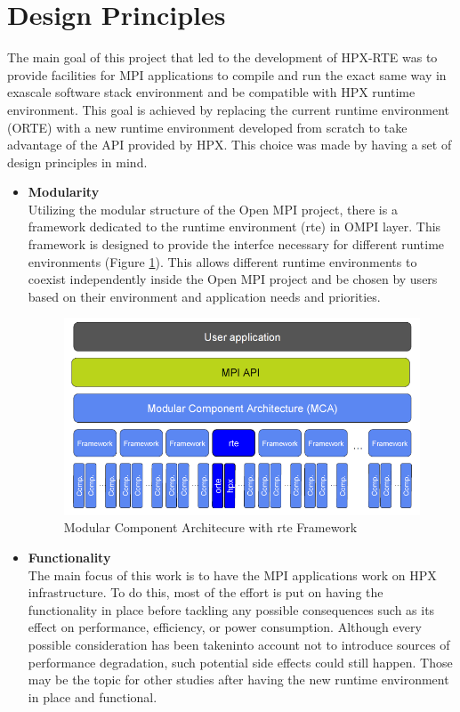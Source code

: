 \section{Design Principles}
\label{sec:design}
The main goal of this project that led to the development of HPX-RTE was to provide facilities for MPI applications to compile and run the exact same way in exascale software stack environment and be compatible with HPX runtime environment. This goal is achieved by replacing the current runtime environment (ORTE) with a new runtime environment developed from scratch to take advantage of the API provided by HPX. This choice was made by having a set of design principles in mind.

\begin{itemize}
\item \textbf{Modularity}\\
  Utilizing the modular structure of the Open MPI project, there is a framework dedicated to the runtime environment (rte) in OMPI layer. This framework is designed to provide the interfce necessary for different runtime environments (Figure \ref{fig:MCA-hpx-rte}). This allows different runtime environments to coexist independently inside the Open MPI project and be chosen by users based on their environment and application needs and priorities.

\begin{figure}[ht]
\centering
\includegraphics[scale=0.5]{images/MCA-hpx-rte.png}
\caption[Modular Component Architecure with rte Framework]{Modular Component Architecure with rte Framework}
\label{fig:MCA-hpx-rte}
\end{figure}
  
\item \textbf{Functionality}\\
  The main focus of this work is to have the MPI applications work on HPX infrastructure. To do this, most of the effort is put on having the functionality in place before tackling any possible consequences such as its effect on performance, efficiency, or power consumption. Although every possible consideration has been takeninto account not to introduce sources of performance degradation, such potential side effects could still happen. Those may be the topic for other studies after having the new runtime environment in place and functional.
  

\end{itemize}
